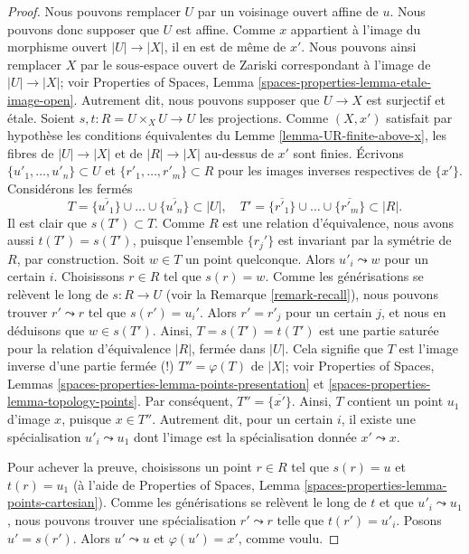 \begin{proof}
Nous pouvons remplacer $U$ par un voisinage ouvert affine de $u$.
Nous pouvons donc supposer que $U$ est affine. Comme $x$ appartient à l'image
du morphisme ouvert $|U| \to |X|$, il en est de même de $x'$. Nous pouvons
ainsi remplacer $X$ par le sous-espace ouvert de Zariski correspondant à
l'image de $|U| \to |X|$; voir
Properties of Spaces,
Lemma \ref{spaces-properties-lemma-etale-image-open}.
Autrement dit, nous pouvons supposer que
$U \to X$ est surjectif et étale.
Soient $s, t : R = U \times_X U \to U$ les projections.
Comme $(X, x')$ satisfait par hypothèse les conditions équivalentes du
Lemme \ref{lemma-UR-finite-above-x},
les fibres de $|U| \to |X|$ et de $|R| \to |X|$
au-dessus de $x'$ sont finies. Écrivons $\{u'_1, \ldots, u'_n\} \subset U$ et
$\{r'_1, \ldots, r'_m\} \subset R$ pour les images inverses respectives
de $\{x'\}$.
Considérons les fermés
$$
T = \overline{\{u'_1\}} \cup \ldots \cup \overline{\{u'_n\}} \subset |U|,
\quad
T' = \overline{\{r'_1\}} \cup \ldots \cup \overline{\{r'_m\}} \subset |R|.
$$
Il est clair que $s(T') \subset T$. Comme $R$ est une relation d'équivalence,
nous avons aussi $t(T') = s(T')$, puisque l'ensemble $\{r_j'\}$ est invariant
par la symétrie de $R$, par construction. Soit $w \in T$ un point quelconque.
Alors $u'_i \leadsto w$ pour un certain $i$. Choisissons $r \in R$
tel que $s(r) = w$. Comme les générisations se relèvent le long de
$s : R \to U$ (voir la Remarque \ref{remark-recall}), nous pouvons trouver
$r' \leadsto r$ tel que $s(r') = u_i'$. Alors $r' = r'_j$ pour un certain $j$,
et nous en déduisons que $w \in s(T')$. Ainsi,
$T = s(T') = t(T')$ est une partie saturée pour la relation d'équivalence
$|R|$, fermée dans $|U|$. Cela signifie que $T$ est l'image inverse d'une
partie fermée (!) $T'' = \varphi(T)$ de $|X|$; voir
Properties of Spaces,
Lemmas \ref{spaces-properties-lemma-points-presentation} et
\ref{spaces-properties-lemma-topology-points}.
Par conséquent, $T'' = \overline{\{x'\}}$.
Ainsi, $T$ contient un point $u_1$ d'image $x$, puisque $x \in T''$.
Autrement dit, pour un certain $i$, il existe une spécialisation
$u'_i \leadsto u_1$ dont l'image est la spécialisation donnée
$x' \leadsto x$.

\medskip\noindent
Pour achever la preuve, choisissons un point $r \in R$ tel que
$s(r) = u$ et $t(r) = u_1$ (à l'aide de
Properties of Spaces,
Lemma \ref{spaces-properties-lemma-points-cartesian}).
Comme les générisations se relèvent le long de $t$ et que
$u'_i \leadsto u_1$, nous pouvons trouver une spécialisation
$r' \leadsto r$ telle que $t(r') = u'_i$.
Posons $u' = s(r')$. Alors $u' \leadsto u$ et $\varphi(u') = x'$, comme voulu.
\end{proof}

